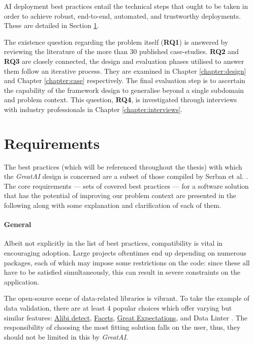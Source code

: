 AI deployment best practices entail the technical steps that ought to be taken in order to achieve robust, end-to-end, automated, and trustworthy deployments. These are detailed in Section \ref{section:requirements}.

The existence question regarding the problem itself (\textbf{RQ1}) is answered by reviewing the literature of the more than 30 published case-studies. \textbf{RQ2} and \textbf{RQ3} are closely connected, the design and evaluation phases utilised to answer them follow an iterative process. They are examined in Chapter \ref{chapter:design} and Chapter \ref{chapter:case} respectively. The final evaluation step is to ascertain the capability of the framework design to generalise beyond a single subdomain and problem context. This question, \textbf{RQ4}, is investigated through interviews with industry professionals in Chapter \ref{chapter:interviews}.

\section{Requirements} \label{section:requirements}

The best practices (which will be referenced throughout the thesis) with which the \textit{GreatAI} design is concerned are a subset of those compiled by Serban et al. \cite{serban2020adoption}. The core requirements --- sets of covered best practices --- for a software solution that has the potential of improving our problem context are presented in the following along with some explanation and clarification of each of them.

\paragraph{General} Albeit not explicitly in the list of best practices, compatibility is vital in encouraging adoption. Large projects oftentimes end up depending on numerous packages, each of which may impose some restrictions on the code: since these all have to be satisfied simultaneously, this can result in severe constraints on the application. 

The open-source scene of data-related libraries is vibrant. To take the example of data validation, there are at least 4 popular choices which offer varying but similar features: \href{https://github.com/SeldonIO/alibi-detect}{Alibi detect}, \href{https://github.com/PAIR-code/facets}{Facets}, \href{https://github.com/great-expectations/great_expectations}{Great Expectations}, and Data Linter \cite{hynes2017data}. The responsibility of choosing the most fitting solution falls on the user, thus, they should not be limited in this by \textit{GreatAI}.


